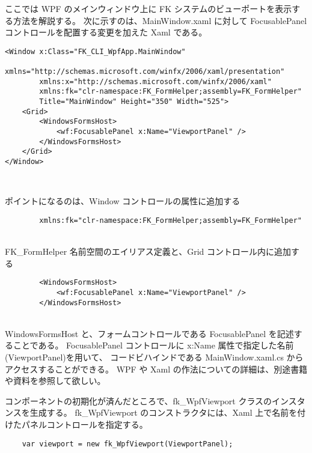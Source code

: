 ここでは WPF のメインウィンドウ上に FK システムのビューポートを表示する方法を解説する。
次に示すのは、MainWindow.xaml に対して FocusablePanel コントロールを配置する変更を加えた Xaml である。
\\
\begin{screen}
\begin{verbatim}
<Window x:Class="FK_CLI_WpfApp.MainWindow"
        xmlns="http://schemas.microsoft.com/winfx/2006/xaml/presentation"
        xmlns:x="http://schemas.microsoft.com/winfx/2006/xaml"
        xmlns:fk="clr-namespace:FK_FormHelper;assembly=FK_FormHelper"
        Title="MainWindow" Height="350" Width="525">
    <Grid>
        <WindowsFormsHost>
            <wf:FocusablePanel x:Name="ViewportPanel" />
        </WindowsFormsHost>
    </Grid>
</Window>
\end{verbatim}
\end{screen}
~

ポイントになるのは、Window コントロールの属性に追加する
\\
\begin{screen}
\begin{verbatim}
        xmlns:fk="clr-namespace:FK_FormHelper;assembly=FK_FormHelper"
\end{verbatim}
\end{screen}
~ \\
FK\_FormHelper 名前空間のエイリアス定義と、Grid コントロール内に追加する
\\
\begin{screen}
\begin{verbatim}
        <WindowsFormsHost>
            <wf:FocusablePanel x:Name="ViewportPanel" />
        </WindowsFormsHost>
\end{verbatim}
\end{screen}
~ \\
WindowsFormsHost と、フォームコントロールである FocusablePanel を記述することである。
FocusablePanel コントロールに x:Name 属性で指定した名前(ViewportPanel)を用いて、
コードビハインドである MainWindow.xaml.cs からアクセスすることができる。
WPF や Xaml の作法についての詳細は、別途書籍や資料を参照して欲しい。

コンポーネントの初期化が済んだところで、fk\_WpfViewport クラスのインスタンスを生成する。
fk\_WpfViewport のコンストラクタには、Xaml 上で名前を付けたパネルコントロールを指定する。
\\
\begin{screen}
\begin{verbatim}
    var viewport = new fk_WpfViewport(ViewportPanel);
\end{verbatim}
\end{screen}
~

